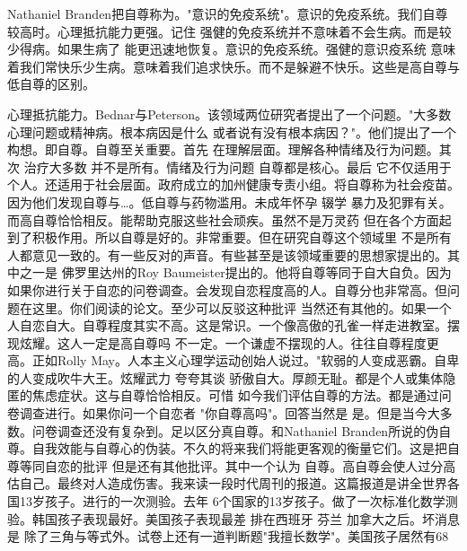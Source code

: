 Nathaniel Branden把自尊称为。"意识的免疫系统"。意识的免疫系统。我们自尊较高时。心理抵抗能力更强。记住 强健的免疫系统并不意味着不会生病。而是较少得病。如果生病了 能更迅速地恢复。意识的免疫系统。强健的意识疫系统 意味着我们常快乐少生病。意味着我们追求快乐。而不是躲避不快乐。这些是高自尊与低自尊的区别。 

心理抵抗能力。Bednar与Peterson。该领域两位研究者提出了一个问题。"大多数心理问题或精神病。根本病因是什么 或者说有没有根本病因？"。他们提出了一个构想。即自尊。自尊至关重要。首先 在理解层面。理解各种情绪及行为问题。其次 治疗大多数 并不是所有。情绪及行为问题 自尊都是核心。最后 它不仅适用于个人。还适用于社会层面。政府成立的加州健康专责小组。将自尊称为社会疫苗。因为他们发现自尊与…。低自尊与药物滥用。未成年怀孕 辍学 暴力及犯罪有关。而高自尊恰恰相反。能帮助克服这些社会顽疾。虽然不是万灵药 但在各个方面起到了积极作用。所以自尊是好的。非常重要。但在研究自尊这个领域里 不是所有人都意见一致的。有一些反对的声音。有些甚至是该领域重要的思想家提出的。其中之一是 佛罗里达州的Roy Baumeister提出的。他将自尊等同于自大自负。因为如果你进行关于自恋的问卷调查。会发现自恋程度高的人。自尊分也非常高。但问题在这里。你们阅读的论文。至少可以反驳这种批评 当然还有其他的。如果一个人自恋自大。自尊程度其实不高。这是常识。一个像高傲的孔雀一样走进教室。摆现炫耀。这人一定是高自尊吗 不一定。一个谦虚不摆现的人。往往自尊程度更高。正如Rolly May。人本主义心理学运动创始人说过。"软弱的人变成恶霸。自卑的人变成吹牛大王。炫耀武力 夸夸其谈 骄傲自大。厚颜无耻。都是个人或集体隐匿的焦虑症状。这与自尊恰恰相反。可惜 如今我们评估自尊的方法。都是通过问卷调查进行。如果你问一个自恋者 "你自尊高吗"。回答当然是 是。但是当今大多数。问卷调查还没有复杂到。足以区分真自尊。和Nathaniel Branden所说的伪自尊。自我效能与自尊心的伪装。不久的将来我们将能更客观的衡量它们。这是把自尊等同自恋的批评 但是还有其他批评。其中一个认为 自尊。高自尊会使人过分高估自己。最终对人造成伤害。我来读一段时代周刊的报道。这篇报道是讲全世界各国13岁孩子。进行的一次测验。去年 6个国家的13岁孩子。做了一次标准化数学测验。韩国孩子表现最好。美国孩子表现最差 排在西班牙 芬兰 加拿大之后。坏消息是 除了三角与等式外。试卷上还有一道判断题"我擅长数学"。美国孩子居然有68%

